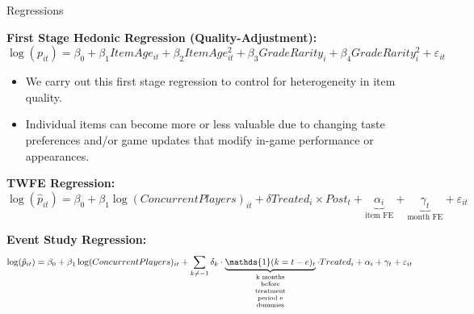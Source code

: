 \documentclass[xcolor=table, envcountsect,12pt]{beamer}
\theoremstyle{remark}
\theoremstyle{theorem}
\theoremstyle{plain}
\begin{document}
\begin{frame}[shrink=30]{Regressions}
\vspace{5mm}

\textbf{First Stage Hedonic Regression (Quality-Adjustment):}
\begin{equation}
    \log(p_{it}) = \beta_0 + \beta_1 ItemAge_{it} + \beta_2 ItemAge_{it}^2 + \beta_3 GradeRarity_{i} + \beta_4 GradeRarity_{i}^2 + \varepsilon_{it}
\end{equation}

\begin{itemize}
	\item We carry out this first stage regression to control for heterogeneity in item quality.
	\item Individual items can become more or less valuable due to changing taste preferences and/or game updates that modify in-game performance or appearances.
\end{itemize}

\textbf{TWFE Regression:}
\begin{equation}
    \log(\hat{p}_{it}) = \beta_0 + \beta_1 \log(ConcurrentPlayers)_{it} + \delta Treated_i\times Post_t + \underbrace{\alpha_i}_{\text{item FE}} + \underbrace{\gamma_t}_{\text{month FE}} + \varepsilon_{it}
\end{equation}

\textbf{Event Study Regression:}
\begin{equation}
	\log(\hat{p}_{it}) = \beta_0 + \beta_1 \log(ConcurrentPlayers)_{it} + \sum_{k\neq-1}\delta_{k}\cdot\underbrace{\mathds{1}(k=t-e)_{t}}_{\parbox{3.5em}{\scriptsize\centering k months before treatment period e dummies}}\cdot Treated_{i} + \alpha_i + \gamma_t + \varepsilon_{it}
\end{equation}
\end{frame}
\end{document}
